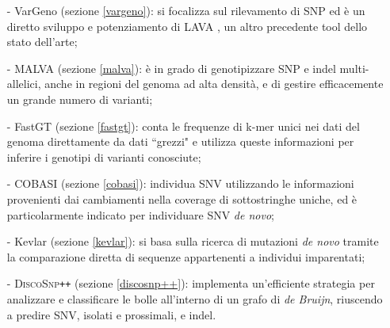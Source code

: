 \documentclass[../main.tex]{subfiles}
\begin{document}
\begin{itemize} 
\item[-] VarGeno (sezione \ref{vargeno}): \cite{sun-medvedev2018vargeno} si focalizza sul rilevamento di SNP ed è un diretto sviluppo e potenziamento di LAVA \cite{shajii2016lava}, un altro precedente tool dello stato dell'arte;
\item[-] MALVA (sezione \ref{malva}): \cite{bernardini2019malva} è in grado di genotipizzare SNP e indel multi-allelici, anche in regioni del genoma ad alta densità, e di gestire efficacemente un grande numero di varianti;
\item[-] FastGT (sezione \ref{fastgt}): \cite{pajuste2017fastgt} conta le frequenze di k-mer unici nei dati del genoma direttamente da dati ``grezzi" e utilizza queste informazioni per inferire i genotipi di varianti conosciute;
\item[-] COBASI (sezione \ref{cobasi}): \cite{gomez-romero2018cobasi} individua SNV utilizzando le informazioni provenienti dai cambiamenti nella coverage di sottostringhe uniche, ed è particolarmente indicato per individuare SNV \textit{de novo};
\item[-] Kevlar (sezione \ref{kevlar}): \cite{standage2019kevlar} si basa sulla ricerca di mutazioni \textit{de novo} tramite la comparazione diretta di sequenze appartenenti a individui imparentati;
\item[-] \textsc{DiscoSnp}\texttt{++} (sezione \ref{discosnp++}): \cite{peterlongo2017discosnp++} implementa un'efficiente strategia per analizzare e classificare le bolle all'interno di un grafo di \textit{de Bruijn}, riuscendo a predire SNV, isolati e prossimali, e indel.
\end{itemize} 
\end{document}
